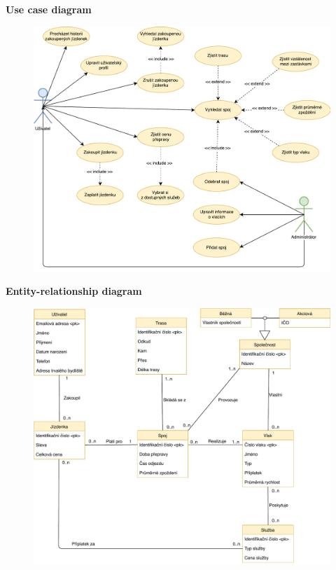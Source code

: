 \documentclass[12pt,a4paper,oneside]{article}
\begin{document}
\clearpage


\begin{LARGE}
\begin{center}
\textbf{Use case diagram}
\end{center}
\end{LARGE}

\bigskip \bigskip \bigskip
\begin{figure}[htb]
	\centering
	\includegraphics[width=0.8\hsize]{use_case.pdf}
\end{figure}

\clearpage


\begin{LARGE}
\begin{center}
\textbf{Entity-relationship diagram}
\end{center}
\end{LARGE}

\bigskip \bigskip \bigskip
\begin{figure}[htb]
	\centering
	\includegraphics[width=0.8\hsize]{erd.pdf}
\end{figure}

\clearpage
\end{document}
